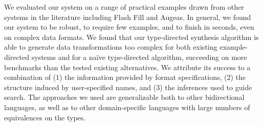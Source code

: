 \documentclass[acmsmall,screen]{acmart}
\begin{document}
We evaluated our system on a range of practical examples drawn from
other systems in the literature including Flash Fill and Augeas.  In
general, we found our system to be robust, to require few examples,
and to finish in seconds, even on complex data formats.  We found that our
type-directed synthesis algorithm is able to generate data
transformations too complex for both existing example-directed systems and for a
na\"{i}ve type-directed algorithm, succeeding on \NumMoreThanFlashFill{} more
benchmarks than 
the tested existing alternatives.
We attribute its success to a combination of (1) the information provided
by format specifications, (2) the structure induced by user-specified
names, and (3) the inferences used to guide search.
The approaches we used are generalizable both to other bidirectional languages,
as well as to other domain-specific languages with large numbers of equivalences
on the types.





\end{document}
